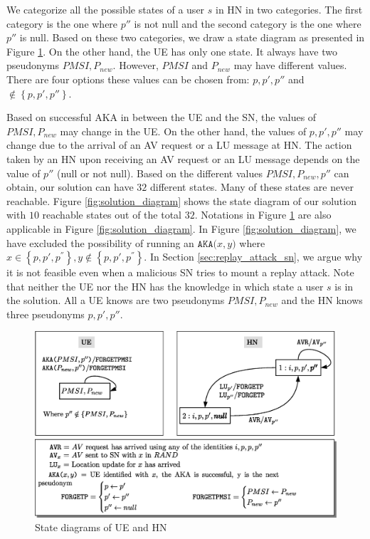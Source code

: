 \documentclass{llncs} %
\begin{document}
We categorize all the possible states of a user $s$ in HN in two categories. The first category is the one where $p''$ is not null and the second category is the one where $p''$ is null. Based on these two categories, we draw a state diagram as presented in Figure \ref{fig:HN_UE_diagrams}. On the other hand, the UE has only one state. It always have two pseudonyms $PMSI, P_{new}$. However, $PMSI$ and $P_{new}$ may have different values. There are four options these values can be chosen from: $p,p',p''$ and $ \notin \left\lbrace p,p',p''\right\rbrace$. 

Based on successful AKA in between the UE and the SN, the values of $PMSI, P_{new}$ may change in the UE. On the other hand, the values of $p,p',p''$ may change due to the arrival of an AV request or a LU message at HN. The action taken by an HN upon receiving an AV request or an LU message depends on the value of $p''$ (null or not null). Based on the different values $PMSI,P_{new},p''$ can obtain, our solution can have $32$ different states. Many of these states are never reachable. Figure \ref{fig:solution_diagram} shows the state diagram of our solution with $10$ reachable states out of the total $32$. Notations in Figure \ref{fig:HN_UE_diagrams} are also applicable in Figure \ref{fig:solution_diagram}. In Figure \ref{fig:solution_diagram}, we have excluded the possibility of running an $\texttt{AKA($x,y$)}$ where $x \in \left\lbrace p,p',p^{''} \right\rbrace, y \notin \left\lbrace p,p',p^{''} \right\rbrace$. In Section \ref{sec:replay_attack_sn}, we argue why it is not feasible even when a malicious SN tries to mount a replay attack. Note that neither the UE nor the HN has the knowledge in which state a user $s$ is in the solution. All a UE knows are two pseudonyms $PMSI,P_{new}$ and the HN knows three pseudonyms $p,p',p''$. 


\begin{figure}
\centering
\includegraphics[width=.9\textwidth]{HN_UE_diagrams.eps}
\caption{State diagrams of UE and HN}
\label{fig:HN_UE_diagrams}
\end{figure}
\end{document}
